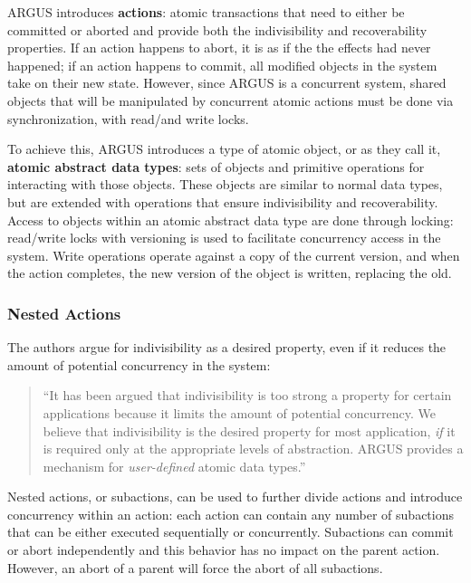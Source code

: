 ARGUS introduces \textbf{actions}: atomic transactions that need to either be committed or aborted and provide both the indivisibility and recoverability properties.  If an action happens to abort, it is as if the the effects had never happened; if an action happens to commit, all modified objects in the system take on their new state.  However, since ARGUS is a concurrent system, shared objects that will be manipulated by concurrent atomic actions must be done via synchronization, with read/and write locks. 

To achieve this, ARGUS introduces a type of atomic object, or as they call it, \textbf{atomic abstract data types}: sets of objects and primitive operations for interacting with those objects.  These objects are similar to normal data types, but are extended with operations that ensure indivisibility and recoverability.  Access to objects within an atomic abstract data type are done through locking: read/write locks with versioning is used to facilitate concurrency access in the system.  Write operations operate against a copy of the current version, and when the action completes, the new version of the object is written, replacing the old.

\subsubsection{Nested Actions}

The authors argue for indivisibility as a desired property, even if it reduces the amount of potential concurrency in the system:

\begin{quote}
``It has been argued that indivisibility is too strong a property for certain applications because it limits the amount of potential concurrency.  We believe that indivisibility is the desired property for most application, \textit{if} it is required only at the appropriate levels of abstraction.  ARGUS provides a mechanism for \textit{user-defined} atomic data types.''	
\end{quote}

Nested actions, or subactions, can be used to further divide actions and introduce concurrency within an action: each action can contain any number of subactions that can be either executed sequentially or concurrently.  Subactions can commit or abort independently and this behavior has no impact on the parent action.  However, an abort of a parent will force the abort of all  subactions.

